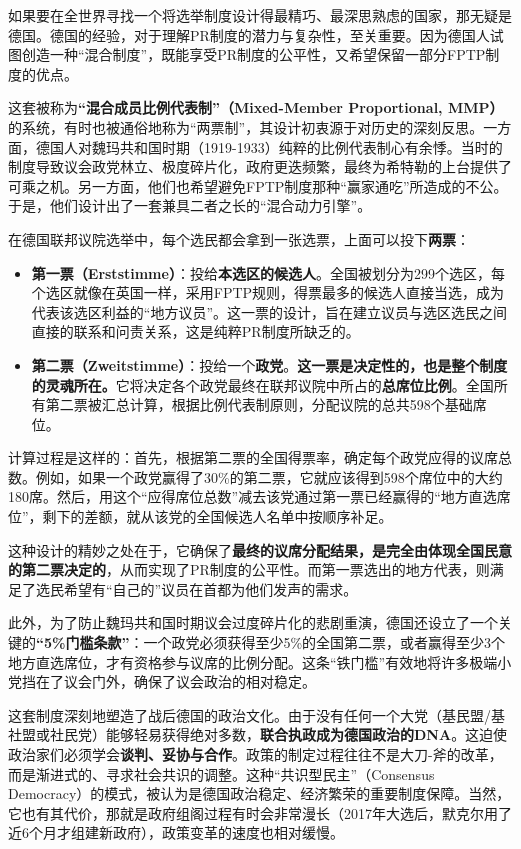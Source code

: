 如果要在全世界寻找一个将选举制度设计得最精巧、最深思熟虑的国家，那无疑是德国。德国的经验，对于理解PR制度的潜力与复杂性，至关重要。因为德国人试图创造一种“混合制度”，既能享受PR制度的公平性，又希望保留一部分FPTP制度的优点。

这套被称为\textbf{“混合成员比例代表制”（Mixed-Member Proportional, MMP）}的系统，有时也被通俗地称为“两票制”，其设计初衷源于对历史的深刻反思。一方面，德国人对魏玛共和国时期（1919-1933）纯粹的比例代表制心有余悸。当时的制度导致议会政党林立、极度碎片化，政府更迭频繁，最终为希特勒的上台提供了可乘之机。另一方面，他们也希望避免FPTP制度那种“赢家通吃”所造成的不公。于是，他们设计出了一套兼具二者之长的“混合动力引擎”。

在德国联邦议院选举中，每个选民都会拿到一张选票，上面可以投下\textbf{两票}：

\begin{itemize}
    \item \textbf{第一票（Erststimme）}：投给\textbf{本选区的候选人}。全国被划分为299个选区，每个选区就像在英国一样，采用FPTP规则，得票最多的候选人直接当选，成为代表该选区利益的“地方议员”。这一票的设计，旨在建立议员与选区选民之间直接的联系和问责关系，这是纯粹PR制度所缺乏的。
    \item \textbf{第二票（Zweitstimme）}：投给一个\textbf{政党}。\textbf{这一票是决定性的，也是整个制度的灵魂所在。}它将决定各个政党最终在联邦议院中所占的\textbf{总席位比例}。全国所有第二票被汇总计算，根据比例代表制原则，分配议院的总共598个基础席位。
\end{itemize}

计算过程是这样的：首先，根据第二票的全国得票率，确定每个政党应得的议席总数。例如，如果一个政党赢得了30\%的第二票，它就应该得到598个席位中的大约180席。然后，用这个“应得席位总数”减去该党通过第一票已经赢得的“地方直选席位”，剩下的差额，就从该党的全国候选人名单中按顺序补足。

这种设计的精妙之处在于，它确保了\textbf{最终的议席分配结果，是完全由体现全国民意的第二票决定的}，从而实现了PR制度的公平性。而第一票选出的地方代表，则满足了选民希望有“自己的”议员在首都为他们发声的需求。

此外，为了防止魏玛共和国时期议会过度碎片化的悲剧重演，德国还设立了一个关键的\textbf{“5\%门槛条款”}：一个政党必须获得至少5\%的全国第二票，或者赢得至少3个地方直选席位，才有资格参与议席的比例分配。这条“铁门槛”有效地将许多极端小党挡在了议会门外，确保了议会政治的相对稳定。

这套制度深刻地塑造了战后德国的政治文化。由于没有任何一个大党（基民盟/基社盟或社民党）能够轻易获得绝对多数，\textbf{联合执政成为德国政治的DNA}。这迫使政治家们必须学会\textbf{谈判、妥协与合作}。政策的制定过程往往不是大刀-斧的改革，而是渐进式的、寻求社会共识的调整。这种“共识型民主”（Consensus Democracy）的模式，被认为是德国政治稳定、经济繁荣的重要制度保障。当然，它也有其代价，那就是政府组阁过程有时会非常漫长（2017年大选后，默克尔用了近6个月才组建新政府），政策变革的速度也相对缓慢。

